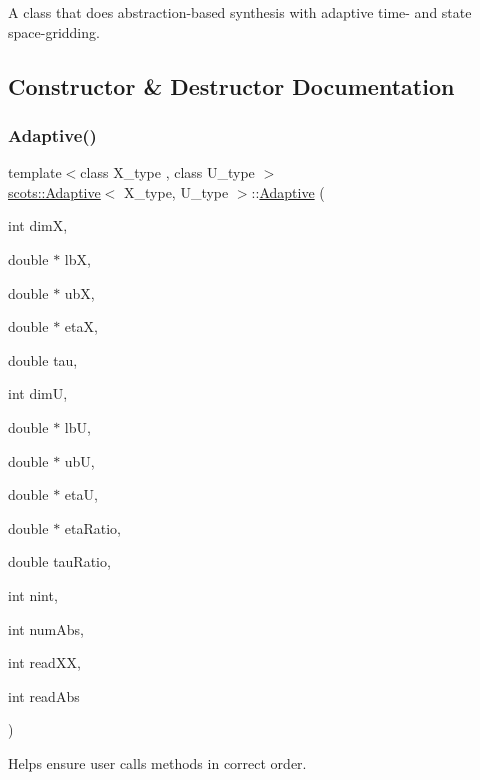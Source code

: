 A class that does abstraction-\/based synthesis with adaptive time-\/ and state space-\/gridding. 

\subsection{Constructor \& Destructor Documentation}
\mbox{\label{classscots_1_1Adaptive_a7a6ba80b2a6679ec1194551be3dee698}} 
\subsubsection{\texorpdfstring{Adaptive()}{Adaptive()}}
{\footnotesize\ttfamily template$<$class X\+\_\+type , class U\+\_\+type $>$ \\
\hyperlink{classscots_1_1Adaptive}{scots\+::\+Adaptive}$<$ X\+\_\+type, U\+\_\+type $>$\+::\hyperlink{classscots_1_1Adaptive}{Adaptive} (\begin{DoxyParamCaption}\item[{int}]{dimX,  }\item[{double $\ast$}]{lbX,  }\item[{double $\ast$}]{ubX,  }\item[{double $\ast$}]{etaX,  }\item[{double}]{tau,  }\item[{int}]{dimU,  }\item[{double $\ast$}]{lbU,  }\item[{double $\ast$}]{ubU,  }\item[{double $\ast$}]{etaU,  }\item[{double $\ast$}]{eta\+Ratio,  }\item[{double}]{tau\+Ratio,  }\item[{int}]{nint,  }\item[{int}]{num\+Abs,  }\item[{int}]{read\+XX,  }\item[{int}]{read\+Abs }\end{DoxyParamCaption})\hspace{0.3cm}{\ttfamily [inline]}}

Helps ensure user calls methods in correct order.

